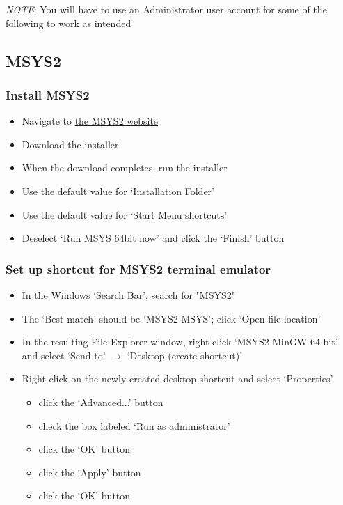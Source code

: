 \emph{NOTE}: You will have to use an Administrator user account for some of the following to work as intended

\subsection{MSYS2}
\subsubsection{Install MSYS2}
\begin{itemize}
	\item Navigate to \href{https://www.msys2.org}{the MSYS2 website}
	\item Download the installer
	\item When the download completes, run the installer
	\item Use the default value for `Installation Folder'
	\item Use the default value for `Start Menu shortcuts'
	\item Deselect `Run MSYS 64bit now' and click the `Finish' button
\end{itemize}

\subsubsection{Set up shortcut for MSYS2 terminal emulator}
\begin{itemize}
	\item In the Windows `Search Bar', search for "MSYS2"
	\item The `Best match' should be `MSYS2 MSYS'; click `Open file location'
	\item In the resulting File Explorer window, right-click `MSYS2 MinGW 64-bit' and select `Send to' $\rightarrow$ `Desktop (create shortcut)'
	\item Right-click on the newly-created desktop shortcut and select `Properties'
	\begin{itemize}
		\item click the `Advanced...' button
		\item check the box labeled `Run as administrator'
		\item click the `OK' button
		\item click the `Apply' button
		\item click the `OK' button
	\end{itemize}
\end{itemize}

